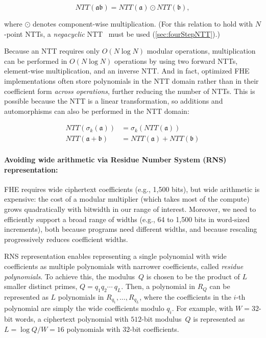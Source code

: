 \begin{equation*}
    NTT(\mathfrak{a}\mathfrak{b}) = NTT(\mathfrak{a}) \odot NTT(\mathfrak{b}),
\end{equation*}

where $\odot$ denotes component-wise multiplication. (For this relation to hold
with $N$\hyp{}point NTTs, a \emph{negacyclic}
NTT~\cite{lyubashevsky:tact10:ideal} must be used (\autoref{sec:fourStepNTT}).)

Because an NTT requires only $O(N \log N)$ modular operations, multiplication
can be performed in $O(N \log N)$ operations by using two forward NTTs,
element-wise multiplication, and an inverse NTT. And in fact, optimized FHE
implementations often store polynomials in the NTT domain rather than in their
coefficient form \emph{across operations}, further reducing the number of NTTs.
This is possible because the NTT is a linear transformation, so additions and
automorphisms can also be performed in the NTT domain:

\begin{align*}
    NTT(\sigma_k(\mathfrak{a})) &= \sigma_k(NTT(\mathfrak{a})) \\
    NTT(\mathfrak{a} + \mathfrak{b}) &= NTT(\mathfrak{a}) + NTT(\mathfrak{b})
\end{align*}

\paragraph{Avoiding wide arithmetic via Residue Number System (RNS) representation:}
FHE requires wide ciphertext coefficients (e.g., 1,500 bits), but wide
arithmetic is expensive: the cost of a modular multiplier (which takes most of
the compute) grows quadratically with bitwidth in our range of interest.
Moreover, we need to efficiently support a broad range of widths (e.g., 64 to
1,500 bits in word-sized increments), both because programs need different
widths, and because rescaling progressively reduces coefficient widths.

RNS representation \cite{garner:1959:residue} enables representing a single
polynomial with wide coefficients as multiple polynomials with narrower
coefficients, called \emph{residue polynomials}. To achieve this, the
modulus~$Q$  is chosen to be the product of $L$ smaller distinct primes, $Q =
q_1q_2\cdots\ q_L$. Then, a polynomial in $R_Q$ can be represented as $L$
polynomials in $R_{q_1}, \ldots, R_{q_L}$, where the coefficients in the $i$-th
polynomial are simply the wide coefficients modulo $q_i$. For example, with $W
= 32$-bit words, a ciphertext polynomial with $512$-bit modulus~$Q$ is
represented as $L = \log Q/W = 16$ polynomials with $32$-bit coefficients.

